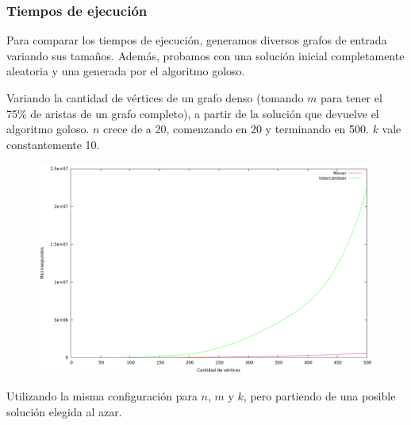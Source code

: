 \subsubsection{Tiempos de ejecución}

Para comparar los tiempos de ejecución, generamos diversos grafos de entrada
variando sus tamaños. Además, probamos con una solución inicial completamente
aleatoria y una generada por el algoritmo goloso.

\vspace*{0.75cm}

Variando la cantidad de vértices de un grafo denso (tomando $m$ para tener el
75\% de aristas de un grafo completo), a partir de la solución que devuelve el
algoritmo goloso. $n$ crece de a 20, comenzando en 20 y terminando en 500.  $k$
vale constantemente 10.

\vspace*{0.5cm}

\begin{figure}[H]
  \begin{center}
    \includegraphics[scale=0.35]{imagenes/local-goloso-n-tiempo.png}
  \end{center}
\end{figure}

\newpage

Utilizando la misma configuración para $n$, $m$ y $k$, pero partiendo de una
posible solución elegida al azar.

\vspace*{0.35cm}

